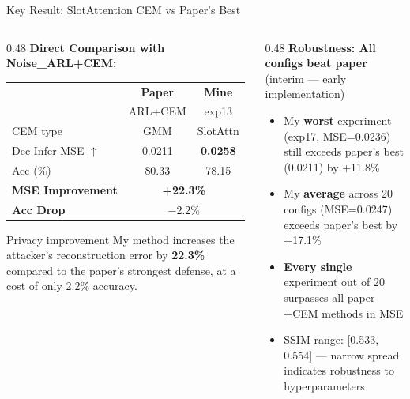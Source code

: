 \documentclass[aspectratio=169, 10pt]{beamer}
\newcommand{\good}[1]{\textcolor{goodgreen}{#1}}
\begin{document}
\begin{frame}{Key Result: SlotAttention CEM vs Paper's Best}

\begin{columns}[T]
\begin{column}{0.48\textwidth}
\textbf{Direct Comparison with Noise\_ARL+CEM:}

\vspace{0.1cm}
\small
\begin{tabular}{lcc}
\toprule
& \textbf{Paper} & \textbf{Mine} \\
& ARL+CEM & exp13 \\
\midrule
CEM type & GMM & \good{SlotAttn} \\
Dec Infer MSE $\uparrow$ & 0.0211 & \good{\textbf{0.0258}} \\
Acc (\%) & 80.33 & 78.15 \\
\midrule
\textbf{MSE Improvement} & \multicolumn{2}{c}{\good{\textbf{+22.3\%}}} \\
\textbf{Acc Drop} & \multicolumn{2}{c}{$-$2.2\%} \\
\bottomrule
\end{tabular}

\vspace{0.15cm}
\begin{alertblock}{\small Privacy improvement}
\small My method increases the attacker's reconstruction error by \good{\textbf{22.3\%}} compared to the paper's strongest defense, at a cost of only 2.2\% accuracy.
\end{alertblock}
\end{column}
\begin{column}{0.48\textwidth}
\textbf{Robustness: All configs beat paper}\\
{\tiny\color{warnorg}(interim --- early implementation)}

\vspace{0.1cm}
\small
\begin{itemize}\setlength{\itemsep}{3pt}
    \item My \textbf{worst} experiment (exp17, MSE=0.0236) still exceeds paper's best (0.0211) by \good{+11.8\%}
    \item My \textbf{average} across 20 configs (MSE=0.0247) exceeds paper's best by \good{+17.1\%}
    \item \textbf{Every single} experiment out of 20 surpasses all paper +CEM methods in MSE
    \item SSIM range: [0.533, 0.554] --- narrow spread indicates \good{robustness} to hyperparameters
\end{itemize}


\end{column}
\end{columns}
\end{frame}
\end{document}
